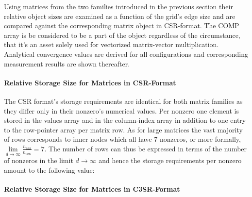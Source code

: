     Using matrices from the two families introduced in the previous section their relative object sizes are examined as
    a function of the grid's edge size and are compared against the corresponding matrix object in CSR-format. The COMP
    array is be considered to be a part of the object regardless of the circumstance, that it's an asset solely used for
    vectorized matrix-vector multiplication. Analytical convergence values are derived for all configurations and
    corresponding measurement results are shown thereafter.

    \paragraph{Relative Storage Size for Matrices in CSR-Format}

    The CSR format's storage requirements are identical for both matrix families as they differ only in their nonzero's
    numerical values. Per nonzero one element is stored in the values array and in the column-index array in addition to
    one entry to the row-pointer array per matrix row. As for large matrices the vast majority of rows corresponds to
    inner nodes which all have $7$ nonzeros, or more formally, $\lim \limits_{d\rightarrow \infty}
    \frac{n_{\text{nnz}}}{n_{\text{row}}} = 7$. The number of rows can thus be expressed in terms of the number of
    nonzeros in the limit $d \rightarrow \infty$ and hence the storage requirements per nonzero amount to the following
    value:

    \begin{center}
    \end{center}

    \paragraph{Relative Storage Size for Matrices in C3SR-Format}

